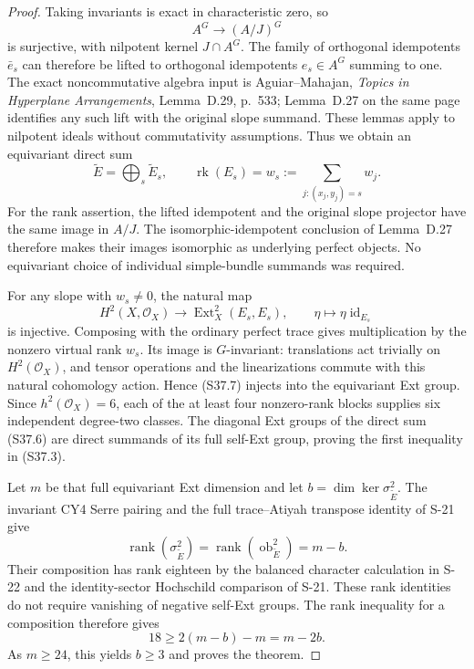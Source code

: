 \documentclass[11pt,a4paper]{article}
\theoremstyle{definition}
\begin{document}
\begin{proof}
Taking invariants is exact in characteristic zero, so
\[
 A^G\longrightarrow(A/J)^G
 \tag{S37.5}
\]
is surjective, with nilpotent kernel $J\cap A^G$.
The family of orthogonal idempotents $\bar e_s$ can
therefore be lifted to orthogonal idempotents
$e_s\in A^G$ summing to one. The exact noncommutative
algebra input is Aguiar--Mahajan, \emph{Topics in
Hyperplane Arrangements}, Lemma~D.29, p.~533;
Lemma~D.27 on the same page identifies any such lift
with the original slope summand. These lemmas apply
to nilpotent ideals without commutativity assumptions.
Thus we obtain an equivariant direct sum
\[
 \widetilde E=\bigoplus_s\widetilde E_s,
 \qquad
 \operatorname{rk}(E_s)=
      w_s:=\sum_{j:(x_j,y_j)=s}w_j.
 \tag{S37.6}
\]
For the rank assertion, the lifted idempotent and the
original slope projector have the same image in $A/J$.
The isomorphic-idempotent conclusion of Lemma~D.27
therefore makes their images isomorphic as underlying
perfect objects. No equivariant choice of individual
simple-bundle summands was required.

For any slope with $w_s\ne0$, the natural map
\[
 H^2(X,\mathcal O_X)\longrightarrow
       \operatorname{Ext}^2_X(E_s,E_s),
 \qquad \eta\longmapsto\eta\operatorname{id}_{E_s}
 \tag{S37.7}
\]
is injective. Composing with the ordinary perfect trace
gives multiplication by the nonzero virtual rank $w_s$.
Its image is $G$-invariant: translations act trivially
on $H^2(\mathcal O_X)$, and tensor operations and the
linearizations commute with this natural cohomology
action. Hence (S37.7) injects into the equivariant
Ext group. Since $h^2(\mathcal O_X)=6$, each of the
at least four nonzero-rank blocks supplies six
independent degree-two classes. The diagonal Ext
groups of the direct sum (S37.6) are direct summands
of its full self-Ext group, proving the first inequality
in (S37.3).

Let $m$ be that full equivariant Ext dimension and
let $b=\dim\ker\sigma^2_{\widetilde E}$.
The invariant CY4 Serre pairing and the full
trace--Atiyah transpose identity of S-21 give
\[
 \operatorname{rank}(\sigma^2_{\widetilde E})
   =\operatorname{rank}(\operatorname{ob}^2_{\widetilde E})
   =m-b.
\]
Their composition has rank eighteen by the balanced
character calculation in S-22 and the identity-sector
Hochschild comparison of S-21. These rank identities
do not require vanishing of negative self-Ext groups.
The rank inequality for a composition therefore gives
\[
 18\ge2(m-b)-m=m-2b.
 \tag{S37.8}
\]
As $m\ge24$, this yields $b\ge3$ and proves the theorem.
\end{proof}
\end{document}
